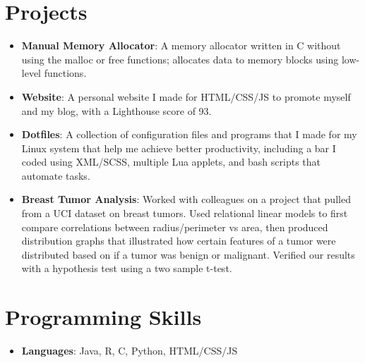 \documentclass[letterpaper,11pt]{article}
\newcommand{\resumeItem}[2]{
  \item\small{
    \textbf{#1}{: #2 \vspace{-2pt}}
  }
}
\newcommand{\resumeSubItem}[2]{\resumeItem{#1}{#2}\vspace{-4pt}}
\newcommand{\resumeSubHeadingListStart}{\begin{itemize}[leftmargin=*]}
\newcommand{\resumeSubHeadingListEnd}{\end{itemize}}
\begin{document}
\section{Projects}
  \resumeSubHeadingListStart
    \resumeSubItem{Manual Memory Allocator}
      {A memory allocator written in C without using the malloc or free functions; allocates data to memory blocks using low-level functions.}
    \resumeSubItem{Website}
      {A personal website I made for HTML/CSS/JS to promote myself and my blog, with a Lighthouse score of 93.}
    \resumeSubItem{Dotfiles}
      {A collection of configuration files and programs that I made for my Linux system that help me achieve better productivity, including a bar I coded using XML/SCSS, multiple Lua applets, and bash scripts that automate tasks.}
    \resumeSubItem{Breast Tumor Analysis}
    {Worked with colleagues on a project that pulled from a UCI dataset on breast tumors. Used relational linear models to first compare correlations between radius/perimeter vs area, then produced distribution graphs that illustrated how certain features of a tumor were distributed based on if a tumor was benign or malignant. Verified our results with a hypothesis test using a two sample t-test.}
  \resumeSubHeadingListEnd

%
\section{Programming Skills}
  \resumeSubHeadingListStart
    \item{
      \textbf{Languages}{: Java, R, C, Python, HTML/CSS/JS}
    }
  \resumeSubHeadingListEnd


\end{document}
